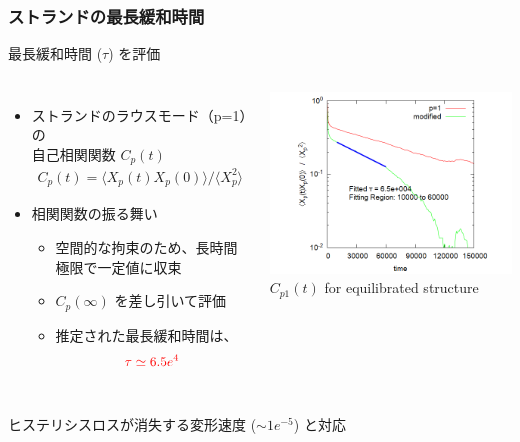 \documentclass[aspectratio=169,11pt, dvipdfmx]{beamer}
\begin{document}
\begin{frame}
	\frametitle{ストランドの最長緩和時間}
	\begin{exampleblock}{最長緩和時間 ($\tau$) を評価}
		\begin{columns}[totalwidth=\linewidth]
			\begin{itemize}
				\item ストランドのラウスモード（p=1）の\\自己相関関数 $C_p(t)$
				\small
				\begin{align*}
					C_p(t) = \langle X_p(t)X_p(0) \rangle/\langle X_p^2 \rangle
				\end{align*}
				\normalsize
				\item 相関関数の振る舞い
				\begin{itemize}
					\item 空間的な拘束のため、長時間極限で一定値に収束
					\item $C_p(\infty)$ を差し引いて評価
					\item 推定された最長緩和時間は、
					\small
					\begin{align*}
						\textcolor{red}{\tau \simeq 6.5e^{4}}
					\end{align*}
					\normalsize
				\end{itemize}
			\end{itemize}
				\centering
					\includegraphics[width=\textwidth]{Xp_1_org.png}\\
					\scriptsize{$C_{p1}(t)$ for equilibrated structure}
		\end{columns}
	\vspace*{2mm}
		\alert{ヒステリシスロスが消失する変形速度 ($\sim 1e^{-5}$) と対応}
	\end{exampleblock}
		
\end{frame}
\end{document}
